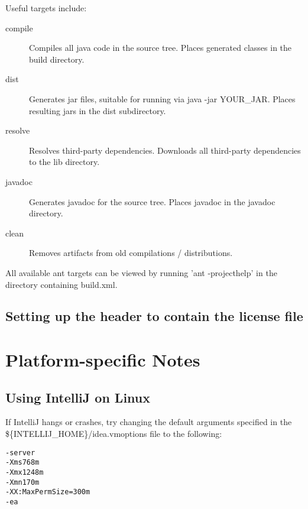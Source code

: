 \documentclass[11pt,fullpage]{article}
\begin{document}
Useful targets include:
\begin{description}
  \item[compile] Compiles all java code in the source tree.  Places generated classes in the build directory.
  \item[dist] Generates jar files, suitable for running via java -jar {YOUR\_JAR}.  Places resulting jars in the dist subdirectory.
  \item[resolve] Resolves third-party dependencies.  Downloads all third-party dependencies to the lib directory.
  \item[javadoc] Generates javadoc for the source tree.  Places javadoc in the javadoc directory.
  \item[clean] Removes artifacts from old compilations / distributions.
\end{description}
All available ant targets can be viewed by running 'ant -projecthelp' in the directory containing build.xml.

\subsection{Setting up the header to contain the license file}

\section{Platform-specific Notes}

\subsection{Using IntelliJ on Linux}
If IntelliJ hangs or crashes, try changing the default arguments specified in the \$\{INTELLIJ\_HOME\}/idea.vmoptions file to the following:

\begin{verbatim}
-server
-Xms768m
-Xmx1248m
-Xmn170m
-XX:MaxPermSize=300m
-ea
\end{verbatim}
\end{document}
